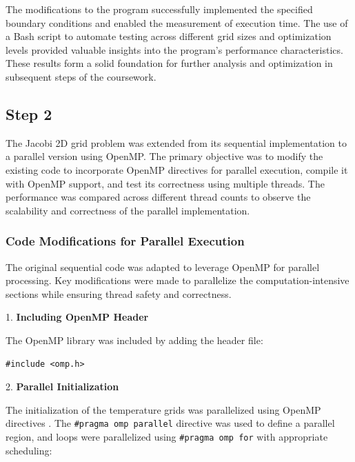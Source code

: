 \documentclass{article}
\begin{document}
The modifications to the program successfully implemented the specified boundary conditions and enabled the measurement of execution time. The use of a Bash script to automate testing across different grid sizes and optimization levels provided valuable insights into the program's performance characteristics. These results form a solid foundation for further analysis and optimization in subsequent steps of the coursework.

\subsection{Step 2}

The Jacobi 2D grid problem was extended from its sequential implementation to a parallel version using OpenMP. The primary objective was to modify the existing code to incorporate OpenMP directives for parallel execution, compile it with OpenMP support, and test its correctness using multiple threads. The performance was compared across different thread counts to observe the scalability and correctness of the parallel implementation.

\subsubsection{Code Modifications for Parallel Execution}

The original sequential code was adapted to leverage OpenMP for parallel processing. Key modifications were made to parallelize the computation-intensive sections while ensuring thread safety and correctness.

1. \textbf{Including OpenMP Header}

   The OpenMP library was included by adding the header file:

   \begin{lstlisting}[style=CStyle, caption={OpenMP Header Inclusion}]
   #include <omp.h>
   \end{lstlisting}

2. \textbf{Parallel Initialization}

    The initialization of the temperature grids was parallelized using OpenMP directives \parencite{chapman2007openmp}. The \texttt{\#pragma omp parallel} directive was used to define a parallel region, and loops were parallelized using \texttt{\#pragma omp for} with appropriate scheduling:
\end{document}
